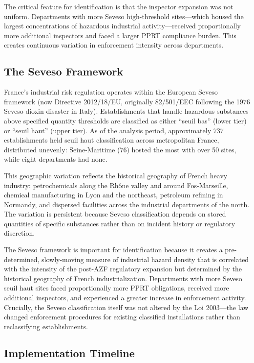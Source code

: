 \documentclass[12pt]{article}
\begin{document}
The critical feature for identification is that the inspector expansion was not uniform. Departments with more Seveso high-threshold sites---which housed the largest concentrations of hazardous industrial activity---received proportionally more additional inspectors and faced a larger PPRT compliance burden. This creates continuous variation in enforcement intensity across departments.

\subsection{The Seveso Framework}

France's industrial risk regulation operates within the European Seveso framework (now Directive 2012/18/EU, originally 82/501/EEC following the 1976 Seveso dioxin disaster in Italy). Establishments that handle hazardous substances above specified quantity thresholds are classified as either ``seuil bas'' (lower tier) or ``seuil haut'' (upper tier). As of the analysis period, approximately 737 establishments held seuil haut classification across metropolitan France, distributed unevenly: Seine-Maritime (76) hosted the most with over 50 sites, while eight departments had none.

This geographic variation reflects the historical geography of French heavy industry: petrochemicals along the Rh\^one valley and around Fos-Marseille, chemical manufacturing in Lyon and the northeast, petroleum refining in Normandy, and dispersed facilities across the industrial departments of the north. The variation is persistent because Seveso classification depends on stored quantities of specific substances rather than on incident history or regulatory discretion.

The Seveso framework is important for identification because it creates a pre-determined, slowly-moving measure of industrial hazard density that is correlated with the intensity of the post-AZF regulatory expansion but determined by the historical geography of French industrialization. Departments with more Seveso seuil haut sites faced proportionally more PPRT obligations, received more additional inspectors, and experienced a greater increase in enforcement activity. Crucially, the Seveso classification itself was not altered by the Loi 2003---the law changed enforcement procedures for existing classified installations rather than reclassifying establishments.

\subsection{Implementation Timeline}
\end{document}
